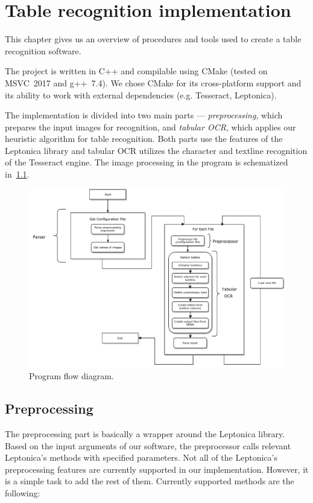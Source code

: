 \chapter{Table recognition implementation}

This chapter gives us an overview of procedures and tools used to create a table recognition software. 

The project is written in C++ and compilable using CMake (tested on \\MSVC~2017 and g++~7.4). We chose CMake for its cross-platform support and its ability to work with external dependencies (e.g. Tesseract, Leptonica). 

The implementation is divided into two main parts --- \emph{preprocessing}, which prepares the input images for recognition, and \emph{tabular OCR}, which applies our heuristic algorithm for table recognition. Both parts use the features of the Leptonica library and tabular OCR utilizes the character and textline recognition of the Tesseract engine. The image processing in the program is schematized in~\cref{fig:programFlow}.

\begin{figure}
    \centering
	\includegraphics[width=1.0\linewidth]{img/implementation/programFlow.pdf}
	\caption{Program flow diagram.}
	\label{fig:programFlow}
\end{figure}

\section{Preprocessing}

The preprocessing part is basically a wrapper around the Leptonica library. Based on the input arguments of our software, the preprocessor calls relevant Leptonica's methods with specified parameters. Not all of the Leptonica's preprocessing features are currently supported in our implementation. However, it is a simple task to add the rest of them. Currently supported methods are the following:

